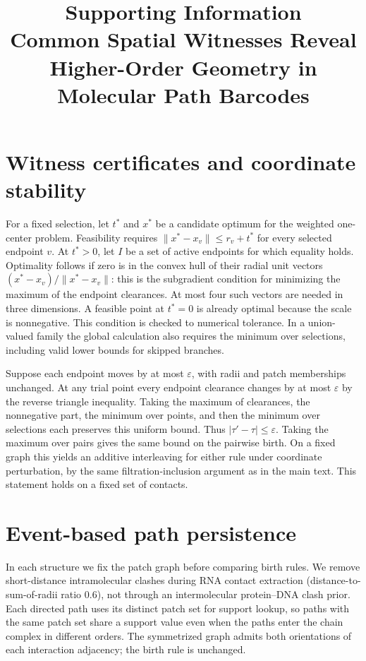 \documentclass[11pt]{article}
\title{Supporting Information\\Common Spatial Witnesses Reveal Higher-Order Geometry in Molecular Path Barcodes}
\author{}
\date{}
\begin{document}
\maketitle

\section{Witness certificates and coordinate stability}

For a fixed selection, let $t^*$ and $x^*$ be a candidate optimum for the weighted one-center problem. Feasibility requires $\|x^*-x_v\|\leq r_v+t^*$ for every selected endpoint $v$. At $t^*>0$, let $I$ be a set of active endpoints for which equality holds. Optimality follows if zero is in the convex hull of their radial unit vectors $(x^*-x_v)/\|x^*-x_v\|$: this is the subgradient condition for minimizing the maximum of the endpoint clearances. At most four such vectors are needed in three dimensions. A feasible point at $t^*=0$ is already optimal because the scale is nonnegative. This condition is checked to numerical tolerance. In a union-valued family the global calculation also requires the minimum over selections, including valid lower bounds for skipped branches.

Suppose each endpoint moves by at most $\varepsilon$, with radii and patch memberships unchanged. At any trial point every endpoint clearance changes by at most $\varepsilon$ by the reverse triangle inequality. Taking the maximum of clearances, the nonnegative part, the minimum over points, and then the minimum over selections each preserves this uniform bound. Thus $|\tau'-\tau|\leq\varepsilon$. Taking the maximum over pairs gives the same bound on the pairwise birth. On a fixed graph this yields an additive interleaving for either rule under coordinate perturbation, by the same filtration-inclusion argument as in the main text. This statement holds on a fixed set of contacts.

\section{Event-based path persistence}

In each structure we fix the patch graph before comparing birth rules. We remove short-distance intramolecular clashes during RNA contact extraction (distance-to-sum-of-radii ratio $0.6$), not through an intermolecular protein--DNA clash prior. Each directed path uses its distinct patch set for support lookup, so paths with the same patch set share a support value even when the paths enter the chain complex in different orders. The symmetrized graph admits both orientations of each interaction adjacency; the birth rule is unchanged.
\end{document}
